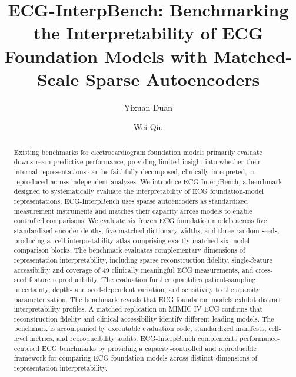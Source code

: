 \documentclass[sigconf,nonacm]{acmart}
\newcommand{\bench}{ECG-InterpBench}
\begin{document}
\title[ECG-InterpBench]{ECG-InterpBench: Benchmarking the Interpretability of ECG Foundation Models with Matched-Scale Sparse Autoencoders}

\author{Yixuan Duan}

\author{Wei Qiu}

\renewcommand{\shortauthors}{Duan and Qiu}

\begin{abstract}
Existing benchmarks for electrocardiogram foundation models primarily evaluate downstream predictive performance, providing limited insight into whether their internal representations can be faithfully decomposed, clinically interpreted, or reproduced across independent analyses. We introduce \bench, a benchmark designed to systematically evaluate the interpretability of ECG foundation-model representations. \bench{} uses sparse autoencoders as standardized measurement instruments and matches their capacity across models to enable controlled comparisons. We evaluate six frozen ECG foundation models across five standardized encoder depths, five matched dictionary widths, and three random seeds, producing a \MSCells{}-cell interpretability atlas comprising \MSMatchedBlocks{} exactly matched six-model comparison blocks.  The benchmark evaluates complementary dimensions of representation interpretability, including sparse reconstruction fidelity, single-feature accessibility and coverage of 49 clinically meaningful ECG measurements, and cross-seed feature reproducibility. The evaluation further quantifies patient-sampling uncertainty, depth- and seed-dependent variation, and sensitivity to the sparsity parameterization. The benchmark reveals that ECG foundation models exhibit distinct interpretability profiles. A matched replication on MIMIC-IV-ECG confirms that reconstruction fidelity and clinical accessibility identify different leading models. The benchmark is accompanied by executable evaluation code, standardized manifests, cell-level metrics, and reproducibility audits. \bench{} complements performance-centered ECG benchmarks by providing a capacity-controlled and reproducible framework for comparing ECG foundation models across distinct dimensions of representation interpretability.
\end{abstract}
\end{document}
